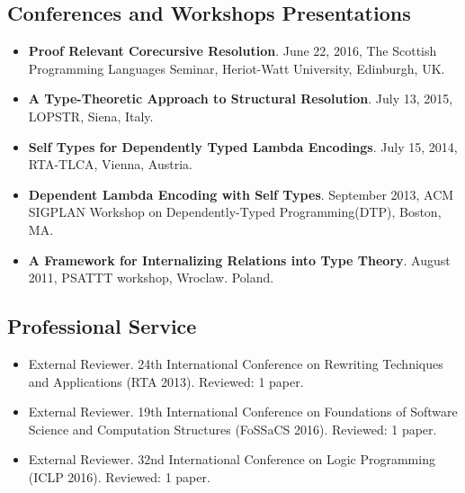 \documentclass{article}
\begin{document}
\begin{itemize}
\begin{itemize}
  \end{itemize}
    
    

\end{itemize}

\subsection*{Conferences and Workshops Presentations}


\begin{itemize}
\item \textbf{Proof Relevant Corecursive Resolution}. June 22, 2016, The Scottish Programming Languages Seminar, Heriot-Watt University, Edinburgh, UK.

\item \textbf{A Type-Theoretic Approach to Structural Resolution}. July 13, 2015, LOPSTR, Siena, Italy. 

\item \textbf{Self Types for Dependently Typed Lambda Encodings}. July 15, 2014, RTA-TLCA, Vienna, Austria. 

\item \textbf{Dependent Lambda Encoding with Self Types}. September 2013, ACM SIGPLAN Workshop on Dependently-Typed Programming(DTP), Boston, MA. 

\item \textbf{A Framework for Internalizing Relations into Type Theory}. August 2011, PSATTT workshop, Wroclaw. Poland. 
\end{itemize}
\subsection*{Professional Service}
\begin{itemize}
\item External Reviewer. 24th International Conference on Rewriting
Techniques and Applications (RTA 2013). Reviewed: 1 paper.

\item External Reviewer. 19th International Conference on Foundations 
  of Software Science and Computation Structures (FoSSaCS 2016). Reviewed: 1 paper.

\item External Reviewer. 32nd International Conference on Logic Programming (ICLP 2016). Reviewed: 1 paper.
\end{itemize}
\end{document}
